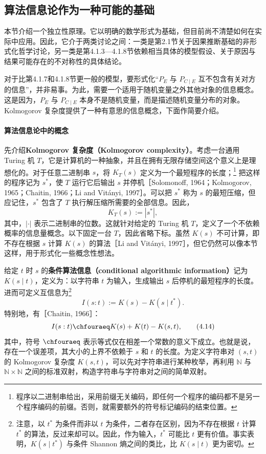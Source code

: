 \subsection{算法信息论作为一种可能的基础}

本节介绍一个独立性原理。它以明确的数学形式为基础，但目前尚不清楚如何在实际中应用。因此，它介于两类讨论之间：一类是第2.1节关于因果推断基础的非形式化哲学讨论，另一类是第4.1.3—4.1.8节依赖相当具体的模型假设、关于原因与结果可能存在的不对称性的具体结论。

对于比第4.1.7和4.1.8节更一般的模型，要形式化“$P_E$ 与 $P_{C\mid E}$ 互不包含有关对方的信息”，并非易事。为此，需要一个适用于随机变量之外其他对象的信息概念。这是因为，$P_E$ 与 $P_{C\mid E}$ 本身不是随机变量，而是描述随机变量分布的对象。Kolmogorov 复杂度提供了一种有意思的信息概念，下面作简要介绍。

\paragraph{算法信息论中的概念}
先介绍\textbf{Kolmogorov 复杂度（Kolmogorov complexity）}。考虑一台通用 Turing 机 $T$，它是计算机的一种抽象，并且在拥有无限存储空间这个意义上是理想化的。对于任意二进制串 $s$，将 $K_T(s)$ 定义为一个最短程序的长度；\footnote{程序以二进制串给出，采用前缀无关编码，即任何一个程序的编码都不是另一个程序编码的前缀。否则，就需要额外的符号标记编码的结束位置。}
把这样的程序记为 $s^*$，使 $T$ 运行它后输出 $s$ 并停机［Solomonoff, 1964；Kolmogorov, 1965；Chaitin, 1966；Li and Vitányi, 1997］。可以把 $s^*$ 称为 $s$ 的最短压缩，但应记住，$s^*$ 包含了 $T$ 执行解压缩所需要的全部信息。因此，
\[
 K_T(s):=|s^*|,
\]
其中，$|\cdot|$ 表示二进制串的位数。这就针对给定的 Turing 机 $T$，定义了一个不依赖概率的信息量概念。以下固定一台 $T$，因此省略下标。虽然 $K(s)$ 不可计算，即不存在根据 $s$ 计算 $K(s)$ 的算法［Li and Vitányi, 1997］，但它仍然可以像本节这样，用于形式化一些概念性想法。

给定 $t$ 时 $s$ 的\textbf{条件算法信息（conditional algorithmic information）}记为 $K(s\mid t)$，定义为：以字符串 $t$ 为输入，生成输出 $s$ 后停机的最短程序的长度。进而可定义互信息为\footnote{注意，以 $t^*$ 为条件而非以 $t$ 为条件，二者存在区别，因为不存在根据 $t$ 计算 $t^*$ 的算法，反过来却可以。因此，作为输入，$t^*$ 可能比 $t$ 更有价值。事实表明，$K(s\mid t^*)$ 与条件 Shannon 熵之间的类比，比 $K(s\mid t)$ 更为密切。}
\[
 I(s:t):=K(s)-K(s\mid t^*).
\]
特别地，有［Chaitin, 1966］：
\begin{equation}
 I(s:t)\chfouraeq K(s)+K(t)-K(s,t),
 \tag{4.14}
\end{equation}
其中，符号 $\chfouraeq$ 表示等式仅在相差一个常数的意义下成立。也就是说，存在一个误差项，其大小的上界不依赖于 $s$ 和 $t$ 的长度。为定义字符串对 $(s,t)$ 的 Kolmogorov 复杂度 $K(s,t)$，可以先对字符串进行某种枚举，再利用 $\mathbb{N}$ 与 $\mathbb{N}\times\mathbb{N}$ 之间的标准双射，构造字符串与字符串对之间的简单双射。


